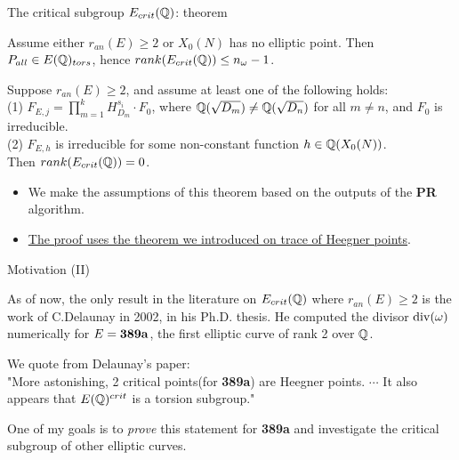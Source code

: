 \documentclass[handout]{beamer}
\begin{document}
\begin{frame}{The critical subgroup $E_{crit}(\mathbb{Q})$: theorem}


\begin{Prop}[C.]
Assume either $r_{an}(E) \geq 2$ or $X_0(N)$ has no elliptic point. Then $P_{all} \in E(\mathbb{Q})_{tors}$,  hence $rank(E_{crit}(\mathbb{Q})) \leq n_{\omega} - 1$. 
\end{Prop}
\pause

\begin{Theorem}[C.]
\label{cor: cm}
Suppose $r_{an}(E) \geq 2$, and assume at least one of the following holds: \\
(1) $F_{E,j} = \prod_{m =1}^k H_{D_m}^{s_i}\cdot F_0$, where 
$\mathbb{Q}(\sqrt{D_m}) \neq \mathbb{Q}(\sqrt{D_n})$ for all $m\neq n$, and $F_0$ is irreducible. \\
(2) $F_{E,h}$ is irreducible for some non-constant function $h \in \mathbb{Q}(X_0(N))$. \\
Then $rank(E_{crit}(\mathbb{Q}))  = 0$. 
\end{Theorem}

\begin{itemize}
\item We make the assumptions of this theorem based on the outputs of the {\bf PR}
algorithm.
\item \hyperlink{proof of cor}{The proof uses the theorem we introduced on trace of Heegner points}.
\end{itemize}
\hypertarget{corollaries}{}
\end{frame}

\begin{frame}{Motivation (II)}

As of now, the only result in the literature on $E_{crit}(\mathbb{Q})$ where $r_{an}(E) \geq 2$ is the work of C.Delaunay in 2002, in his Ph.D. thesis. He computed  the divisor $\operatorname{div}(\omega)$ numerically for $E = {\bf 389a}$, the first elliptic curve of rank 2 over $\mathbb{Q}$. 

\pause
\smallskip

We quote from Delaunay's paper: \\

"More astonishing, 2 critical points(for {\bf 389a}) are Heegner points. $\cdots$ It also appears that $E(\mathbb{Q})^{crit}$ is a torsion subgroup."

\pause
\smallskip

One of my goals is to {\em prove} this statement for {\bf 389a} and investigate the critical subgroup of other elliptic curves. 


\end{frame}
\end{document}
